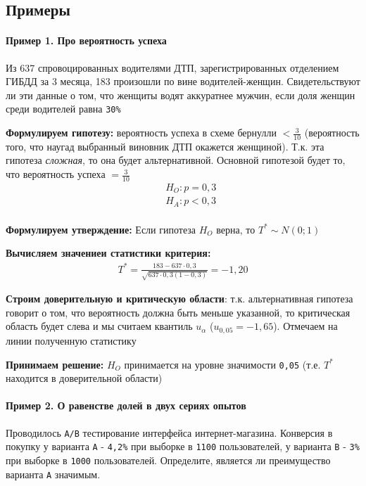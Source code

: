 \documentclass[12pt]{extarticle}
\begin{document}
\subsection{Примеры}
\paragraph{Пример 1. Про вероятность успеха}
Из 637 спровоцированных водителями ДТП, зарегистрированных отделением
ГИБДД за 3 месяца, 183 произошли по вине водителей-женщин.
Свидетельствуют ли эти данные о том, что женщиты водят аккуратнее
мужчин, если доля женщин среди водителей равна \verb|30%|
\par \textbf{Формулируем гипотезу:} вероятность успеха в схеме бернулли $<
\frac{3}{10}$ (вероятность того, что наугад выбранный виновник ДТП
окажется женщиной). Т.к. эта гипотеза \textit{сложная}, то она будет
альтернативной. Основной гипотезой будет то, что вероятность успеха $=
\frac{3}{10}$
\begin{eqnarray*}
&&H_{O}:p=0,3\\
&&H_{A}:p<0,3\\
\end{eqnarray*}
\par \textbf{Формулируем утверждение:} Если гипотеза $H_{O}$ верна, то
$T^{*}\sim N(0;1)$
\par \textbf{Вычисляем значениеи статистики критерия:}
\begin{eqnarray*}
    T^{*}=\frac{183-637\cdot 0,3}{\sqrt{637\cdot 0,3(1-0,3)}}=-1,20
\end{eqnarray*}
\par \textbf{Строим доверительную и критическую области}: т.к.
альтернативная гипотеза говорит о том, что вероятность должна быть
меньше указанной, то критическая область будет слева и мы считаем
квантиль $u_{\alpha}$ ($u_{0,05}=-1,65$). Отмечаем на линии полученную
статистику
\par \textbf{Принимаем решение:} $H_{O}$ принимается на уровне
значимости \verb|0,05| (т.е. $T^{*}$ находится в доверительной области)

\paragraph{Пример 2. О равенстве долей в двух сериях опытов}
Проводилось \verb|A/B| тестирование интерфейса интернет-магазина.
Конверсия в покупку у варианта \verb|A| - \verb|4,2%| при выборке в
\verb|1100| пользователей, у варианта \verb|B| - \verb|3%| при выборке в
\verb|1000| пользователей. Определите, является ли преимущество варианта
\verb|A| значимым.
\end{document}
